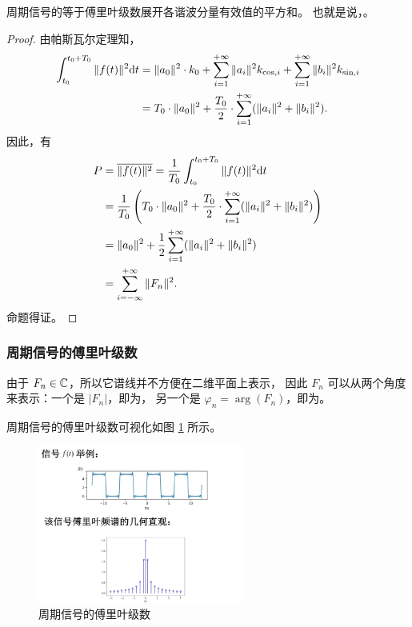 \begin{corollary}[帕斯瓦尔定理的推论]
    周期信号的等于傅里叶级数展开各谐波分量有效值的平方和。
    也就是说，。
\end{corollary}

\begin{proof}
    由帕斯瓦尔定理知，
    \begin{align*}
        \int_{t_0}^{t_0 + T_0}\|f(t)\|^2\mathrm{d}t & = \|a_0\|^2\cdot k_0
            + \sum_{i = 1}^{+\infty}\|a_i\|^2k_{\cos, i}
            + \sum_{i = 1}^{+\infty}\|b_i\|^2k_{\sin, i} \\
        & = T_0 \cdot \|a_0\|^2 + \frac{T_0}{2}\cdot \sum_{i = 1}^{+\infty}(\|a_i\|^2 + \|b_i\|^2).
    \end{align*}
    因此，有
    \begin{align*}
        P & = \overline{\|f(t)\|^2} = \frac{1}{T_0}\int_{t_0}^{t_0 + T_0}\|f(t)\|^2\mathrm{d}t \\
        & = \frac{1}{T_0}\left(T_0 \cdot \|a_0\|^2 + \frac{T_0}{2}\cdot \sum_{i = 1}^{+\infty}(\|a_i\|^2 + \|b_i\|^2)\right) \\
        & = \|a_0\|^2 + \frac{1}{2}\sum_{i = 1}^{+\infty}(\|a_i\|^2 + \|b_i\|^2) \\
        & = \sum_{i = -\infty}^{+\infty}\|F_n\|^2.
    \end{align*}
    命题得证。
\end{proof}

\subsubsection{周期信号的傅里叶级数}

\begin{definition}
    由于 $F_n \in \mathbb{C}$，所以它谱线并不方便在二维平面上表示，
    因此 $F_n$ 可以从两个角度来表示：一个是 $|F_n|$，即为，
    另一个是 $\varphi_n = \arg(F_n)$，即为。

    周期信号的傅里叶级数可视化如图 \ref{fig:periodic-signal-fourier-series} 所示。
    \begin{figure}[H]
        \centering
        \includegraphics[width = 0.6\textwidth]{chap2/img/periodic-signal-fourier-series.png}
        \caption{周期信号的傅里叶级数}
        \label{fig:periodic-signal-fourier-series}
    \end{figure}
\end{definition}

